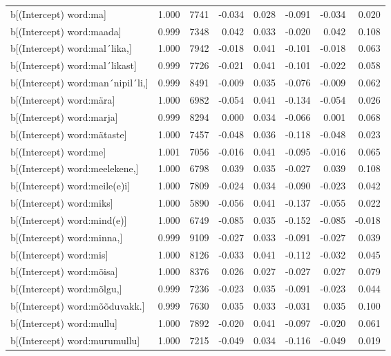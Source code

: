 \begin{longtable}{lrrrrrrr}
  b[(Intercept) word:ma] & 1.000 & 7741 & -0.034 & 0.028 & -0.091 & -0.034 & 0.020 \\ 
  b[(Intercept) word:maada] & 0.999 & 7348 & 0.042 & 0.033 & -0.020 & 0.042 & 0.108 \\ 
  b[(Intercept) word:mal´lika,] & 1.000 & 7942 & -0.018 & 0.041 & -0.101 & -0.018 & 0.063 \\ 
  b[(Intercept) word:mal´likast] & 0.999 & 7726 & -0.021 & 0.041 & -0.101 & -0.022 & 0.058 \\ 
  b[(Intercept) word:man´nipil´li,] & 0.999 & 8491 & -0.009 & 0.035 & -0.076 & -0.009 & 0.062 \\ 
  b[(Intercept) word:mära] & 1.000 & 6982 & -0.054 & 0.041 & -0.134 & -0.054 & 0.026 \\ 
  b[(Intercept) word:marja] & 0.999 & 8294 & 0.000 & 0.034 & -0.066 & 0.001 & 0.068 \\ 
  b[(Intercept) word:mätaste] & 1.000 & 7457 & -0.048 & 0.036 & -0.118 & -0.048 & 0.023 \\ 
  b[(Intercept) word:me] & 1.001 & 7056 & -0.016 & 0.041 & -0.095 & -0.016 & 0.065 \\ 
  b[(Intercept) word:meelekene,] & 1.000 & 6798 & 0.039 & 0.035 & -0.027 & 0.039 & 0.108 \\ 
  b[(Intercept) word:meile(e)i] & 1.000 & 7809 & -0.024 & 0.034 & -0.090 & -0.023 & 0.042 \\ 
  b[(Intercept) word:miks] & 1.000 & 5890 & -0.056 & 0.041 & -0.137 & -0.055 & 0.022 \\ 
  b[(Intercept) word:mind(e)] & 1.000 & 6749 & -0.085 & 0.035 & -0.152 & -0.085 & -0.018 \\ 
  b[(Intercept) word:minna,] & 0.999 & 9109 & -0.027 & 0.033 & -0.091 & -0.027 & 0.039 \\ 
  b[(Intercept) word:mis] & 1.000 & 8126 & -0.033 & 0.041 & -0.112 & -0.032 & 0.045 \\ 
  b[(Intercept) word:mõisa] & 1.000 & 8376 & 0.026 & 0.027 & -0.027 & 0.027 & 0.079 \\ 
  b[(Intercept) word:mõlgu,] & 0.999 & 7236 & -0.023 & 0.035 & -0.091 & -0.023 & 0.044 \\ 
  b[(Intercept) word:mõõduvakk.] & 0.999 & 7630 & 0.035 & 0.033 & -0.031 & 0.035 & 0.100 \\ 
  b[(Intercept) word:mullu] & 1.000 & 7892 & -0.020 & 0.041 & -0.097 & -0.020 & 0.061 \\ 
  b[(Intercept) word:murumullu] & 1.000 & 7215 & -0.049 & 0.034 & -0.116 & -0.049 & 0.019 \\ 

\end{longtable}
